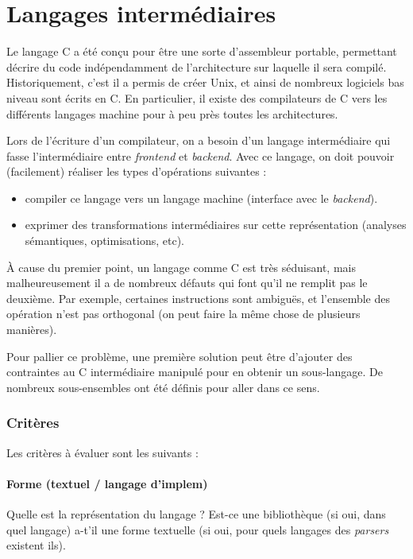 \section{Langages intermédiaires}

Le langage C \cite{KandR,AnsiC} a été conçu pour être une sorte d'assembleur
portable, permettant décrire du code indépendamment de l'architecture sur
laquelle il sera compilé. Historiquement, c'est il a permis de créer Unix, et
ainsi de nombreux logiciels bas niveau sont écrits en C. En particulier, il
existe des compilateurs de C vers les différents langages machine pour à peu
près toutes les architectures.

Lors de l'écriture d'un compilateur, on a besoin d'un langage intermédiaire qui
fasse l'intermédiaire entre \emph{frontend} et \emph{backend}. Avec ce langage,
on doit pouvoir (facilement) réaliser les types d'opérations suivantes :

\begin{itemize}
\item
  compiler ce langage vers un langage machine (interface avec le
  \emph{backend}).
\item
  exprimer des transformations intermédiaires sur cette représentation
  (analyses sémantiques, optimisations, etc).
\end{itemize}

À cause du premier point, un langage comme C est très séduisant, mais
malheureusement il a de nombreux défauts qui font qu'il ne remplit pas le
deuxième. Par exemple, certaines instructions sont ambiguës, et l'ensemble des
opération n'est pas orthogonal (on peut faire la même chose de plusieurs
manières).

Pour pallier ce problème, une première solution peut être d'ajouter des
contraintes au C intermédiaire manipulé pour en obtenir un sous-langage. De
nombreux sous-ensembles ont été définis pour aller dans ce sens.

\subsubsection{Critères}

Les critères à évaluer sont les suivants :

\paragraph{Forme (textuel / langage d'implem)}

Quelle est la représentation du langage ? Est-ce une bibliothèque (si oui, dans
quel langage) a-t'il une forme textuelle (si oui, pour quels langages des
\emph{parsers} existent ils).

